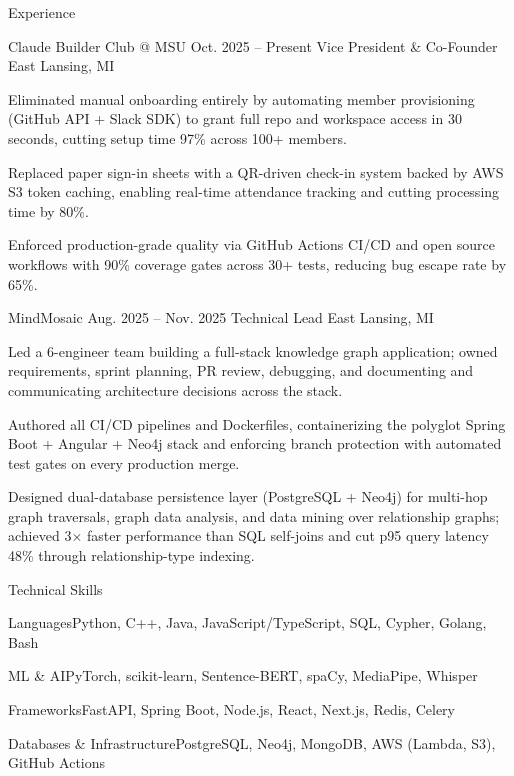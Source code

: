 \documentclass[
	11pt
]{../../../resume}
\begin{document}
	\begin{rSection}{E}{xperience}
		\begin{rSectionEntry}
			{Claude Builder Club @ MSU}
			{Oct. 2025 -- Present}
			{Vice President \& Co-Founder}
			{}
			{East Lansing, MI}

			\item Eliminated manual onboarding entirely by automating member provisioning (GitHub API + Slack SDK) to grant full repo and workspace access in 30 seconds, cutting setup time 97\% across 100+ members.
			\item Replaced paper sign-in sheets with a QR-driven check-in system backed by AWS S3 token caching, enabling real-time attendance tracking and cutting processing time by 80\%.
			\item Enforced production-grade quality via GitHub Actions CI/CD and open source workflows with 90\% coverage gates across 30+ tests, reducing bug escape rate by 65\%.
		\end{rSectionEntry}

		\begin{rSectionEntry}
			{MindMosaic}
			{Aug. 2025 -- Nov. 2025}
			{Technical Lead}
			{}
			{East Lansing, MI}

			\item Led a 6-engineer team building a full-stack knowledge graph application; owned requirements, sprint planning, PR review, debugging, and documenting and communicating architecture decisions across the stack.
			\item Authored all CI/CD pipelines and Dockerfiles, containerizing the polyglot Spring Boot + Angular + Neo4j stack and enforcing branch protection with automated test gates on every production merge.
			\item Designed dual-database persistence layer (PostgreSQL + Neo4j) for multi-hop graph traversals, graph data analysis, and data mining over relationship graphs; achieved 3$\times$ faster performance than SQL self-joins and cut p95 query latency 48\% through relationship-type indexing.
		\end{rSectionEntry}
	\end{rSection}

	\begin{rSection}{T}{echnical Skills}
		\begin{rSet}{Languages}{Python, C++, Java, JavaScript/TypeScript, SQL, Cypher, Golang, Bash}
		\end{rSet}
		\begin{rSet}{ML \& AI}{PyTorch, scikit-learn, Sentence-BERT, spaCy, MediaPipe, Whisper}
		\end{rSet}
		\begin{rSet}{Frameworks}{FastAPI, Spring Boot, Node.js, React, Next.js, Redis, Celery}
		\end{rSet}
		\begin{rSet}{Databases \& Infrastructure}{PostgreSQL, Neo4j, MongoDB, AWS (Lambda, S3), GitHub Actions}
		\end{rSet}
	\end{rSection}
\end{document}
